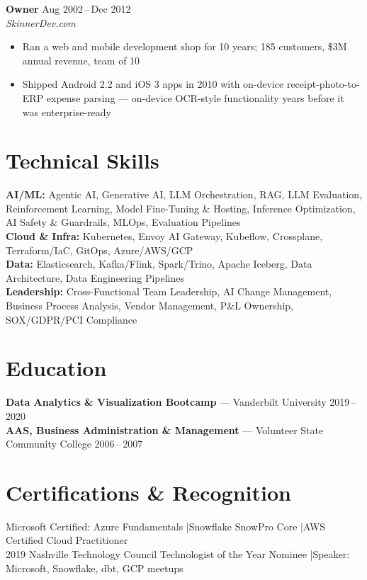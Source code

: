 \documentclass[letterpaper,18pt]{extarticle}
\begin{document}
\textbf{Owner} \hfill Aug 2002\,--\,Dec 2012 \\
\textit{SkinnerDev.com}
\begin{itemize}
  \item Ran a web and mobile development shop for 10 years; 185 customers, \$3M annual revenue, team of 10
  \item Shipped Android 2.2 and iOS 3 apps in 2010 with on-device receipt-photo-to-ERP expense parsing --- on-device OCR-style functionality years before it was enterprise-ready
\end{itemize}

\section{Technical Skills}

\textbf{AI/ML:} Agentic AI, Generative AI, LLM Orchestration, RAG, LLM Evaluation, Reinforcement Learning, Model Fine-Tuning \& Hosting, Inference Optimization, AI Safety \& Guardrails, MLOps, Evaluation Pipelines \\
\textbf{Cloud \& Infra:} Kubernetes, Envoy AI Gateway, Kubeflow, Crossplane, Terraform/IaC, GitOps, Azure/AWS/GCP \\
\textbf{Data:} Elasticsearch, Kafka/Flink, Spark/Trino, Apache Iceberg, Data Architecture, Data Engineering Pipelines \\
\textbf{Leadership:} Cross-Functional Team Leadership, AI Change Management, Business Process Analysis, Vendor Management, P\&L Ownership, SOX/GDPR/PCI Compliance

\section{Education}

\textbf{Data Analytics \& Visualization Bootcamp} --- Vanderbilt University \hfill 2019\,--\,2020 \\
\textbf{AAS, Business Administration \& Management} --- Volunteer State Community College \hfill 2006\,--\,2007

\section{Certifications \& Recognition}

Microsoft Certified: Azure Fundamentals \quad|\quad Snowflake SnowPro Core \quad|\quad AWS Certified Cloud Practitioner \\
2019 Nashville Technology Council Technologist of the Year Nominee \quad|\quad Speaker: Microsoft, Snowflake, dbt, GCP meetups
\end{document}
